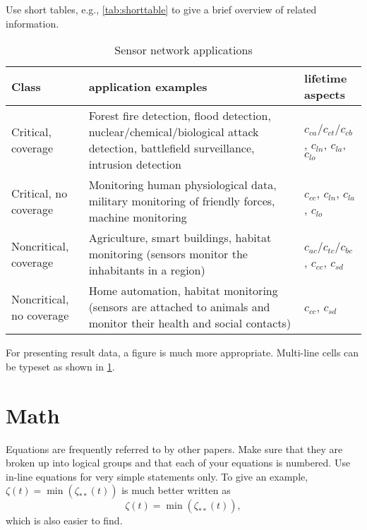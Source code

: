 \documentclass[]{nsm-thesis}
\begin{document}
Use short tables, e.g., \cref{tab:shorttable} to give a brief overview of related information.

\begin{table}
    \centering
    \begin{tabular}{>{\raggedright}p{1.7cm}p{5.4cm}p{3.4cm}}
        \toprule
        Class & application examples & lifetime aspects \\
        \midrule
        Critical, coverage &
                Forest fire detection, flood detection, nuclear/chemical/biological attack detection, battlefield surveillance, intrusion detection &
                $c_{ca}$/$c_{ct}$/$c_{cb}$, $c_{ln}$, $c_{la}$, $c_{lo}$\\
        Critical, no coverage &
                Monitoring human physiological data, military monitoring of friendly forces, machine monitoring &
                $c_{cc}$, $c_{ln}$, $c_{la}$, $c_{lo}$ \\
        Noncritical, coverage &
                Agriculture, smart buildings, habitat monitoring (sensors monitor the inhabitants in a region) &
                $c_{ac}$/$c_{tc}$/$c_{bc}$, $c_{cc}$, $c_{sd}$ \\
        Noncritical, no coverage &
                Home automation, habitat monitoring (sensors are attached to animals and monitor their health and social contacts) &
                $c_{cc}$, $c_{sd}$ \\
        \bottomrule
    \end{tabular}
    \caption{Sensor network applications}
    \label{tab:SensorNetworkApplications}
\end{table}

For presenting result data, a figure is much more appropriate.
Multi-line cells can be typeset as shown in \cref{tab:SensorNetworkApplications}.

\clearpage
\section{Math}

Equations are frequently referred to by other papers.
Make sure that they are broken up into logical groups and that each of your equations is numbered.
Use in-line equations for very simple statements only.
To give an example, $\zeta(t) = \min( \zeta_{**}(t))$ is much better written as
\begin{equation}\label{eq:zeta}
\zeta(t) =
    \min\left(
        \zeta_{**}(t)
    \right)
,
\end{equation}
which is also easier to find.
\end{document}

